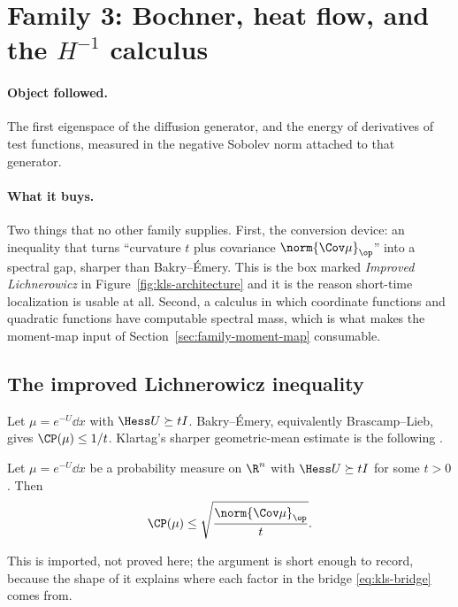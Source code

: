 \documentclass[../../main.tex]{subfiles}
\begin{document}
\section{Family 3: Bochner, heat flow, and the \texorpdfstring{$H^{-1}$}{H-1} calculus}
\label{sec:family-bochner}

\paragraph{Object followed.}
The first eigenspace of the diffusion generator, and the energy of derivatives of test functions,
measured in the negative Sobolev norm attached to that generator.

\paragraph{What it buys.}
Two things that no other family supplies. First, the conversion device: an inequality that turns
``curvature $t$ plus covariance $\norm{\Cov\mu}_\op$'' into a spectral gap, sharper than
Bakry--\'Emery. This is the box marked \emph{Improved Lichnerowicz} in
Figure~\ref{fig:kls-architecture} and it is the reason short-time localization is usable at all.
Second, a calculus in which coordinate functions and quadratic functions have computable spectral
mass, which is what makes the moment-map input of Section~\ref{sec:family-moment-map} consumable.

\subsection{The improved Lichnerowicz inequality}
\label{subsec:improved-lichnerowicz}

Let $\mu=e^{-U}\dd x$ with $\Hess U\succeq tI$. Bakry--\'Emery, equivalently Brascamp--Lieb, gives
$\CP(\mu)\le1/t$. Klartag's sharper geometric-mean estimate is the following
\cite{Klartag2023Logarithmic}.

\begin{theorem}
\label{thm:improved-lichnerowicz}
Let $\mu=e^{-U}\dd x$ be a probability measure on $\R^n$ with $\Hess U\succeq tI$ for some $t>0$.
Then
\begin{equation}
  \CP(\mu)\le\sqrt{\frac{\norm{\Cov\mu}_\op}{t}} .
  \label{eq:improved-lichnerowicz}
\end{equation}
\end{theorem}

This is imported, not proved here; the argument is short enough to record, because the shape of it
explains where each factor in the bridge \eqref{eq:kls-bridge} comes from.
\end{document}
